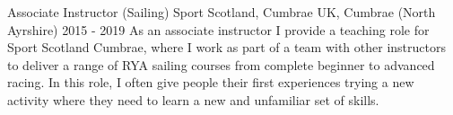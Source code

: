   \cventry
    {Associate Instructor (Sailing)} %
    {Sport Scotland, Cumbrae} %
    {UK, Cumbrae (North Ayrshire)} %
    {2015 - 2019} %
    {
      As an associate instructor I provide a teaching role for Sport Scotland Cumbrae, where I work as part of a team with other instructors to deliver a range of RYA sailing courses from complete beginner to advanced racing. In this role, I often give people their first experiences trying a new activity where they need to learn a new and unfamiliar set of skills.\newline
    }
